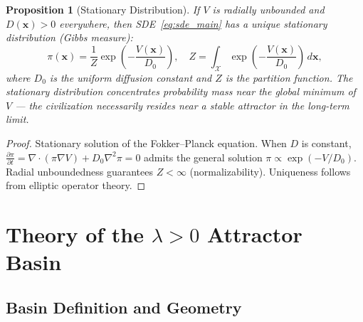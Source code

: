 \documentclass[12pt,a4paper]{article}
\newtheorem{proposition}[theorem]{Proposition}
\theoremstyle{definition}
\newcommand{\paren}[1]{\left(#1\right)}
\newcommand{\calX}{\mathcal{X}}
\newcommand{\lb}{\lambda}
\newcommand{\Lyap}{V}
\newcommand{\grad}{\nabla}
\newcommand{\ppart}[2]{\frac{\partial #1}{\partial #2}}
\begin{document}
\begin{proposition}[Stationary Distribution]
\label{prop:stationary}
If $\Lyap$ is radially unbounded and $D(\mathbf{x}) > 0$ everywhere, then SDE~\eqref{eq:sde_main} has a unique stationary distribution (Gibbs measure):
\begin{equation}\label{eq:gibbs}
    \pi(\mathbf{x}) = \frac{1}{Z} \exp\paren{-\frac{\Lyap(\mathbf{x})}{D_0}}, \quad Z = \int_{\calX} \exp\paren{-\frac{\Lyap(\mathbf{x})}{D_0}} \, d\mathbf{x},
\end{equation}
where $D_0$ is the uniform diffusion constant and $Z$ is the partition function. The stationary distribution concentrates probability mass near the global minimum of $\Lyap$ --- the civilization necessarily resides near a stable attractor in the long-term limit.
\end{proposition}

\begin{proof}
Stationary solution of the Fokker--Planck equation. When $D$ is constant, $\ppart{\pi}{t} = \grad \cdot (\pi \grad \Lyap) + D_0 \nabla^2 \pi = 0$ admits the general solution $\pi \propto \exp(-\Lyap/D_0)$. Radial unboundedness guarantees $Z < \infty$ (normalizability). Uniqueness follows from elliptic operator theory.
\end{proof}

\section{Theory of the $\lb>0$ Attractor Basin}
\label{sec:basin}

\subsection{Basin Definition and Geometry}
\label{sec:basin_def}
\end{document}
